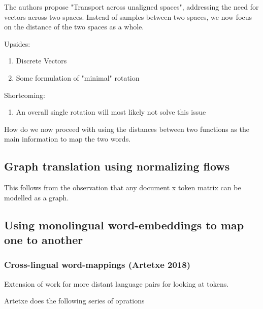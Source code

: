 \documentclass[a4paper,12pt,twoside,openright]{report}
\begin{document}
The authors propose "Transport across unaligned spaces", addressing the need for vectors across two spaces.
Instead of samples between two spaces, we now focus on the distance of the two spaces as a whole.


Upsides:
\begin{enumerate}
\item Discrete Vectors
\item Some formulation of "minimal" rotation
\end{enumerate}

Shortcoming:
\begin{enumerate}
\item An overall single rotation will most likely not solve this issue
\end{enumerate}



How do we now proceed with using the distances between two functions as the main information to map the two words.


\subsection{Graph translation using normalizing flows}

This follows from the observation that any document x token matrix can be modelled as a graph.



\subsection{Using monolingual word-embeddings to map one to another}

\subsubsection{Cross-lingual word-mappings (Artetxe 2018)}

Extension of work for more distant language pairs for looking at tokens.

Artetxe does the following series of oprations
\end{document}

